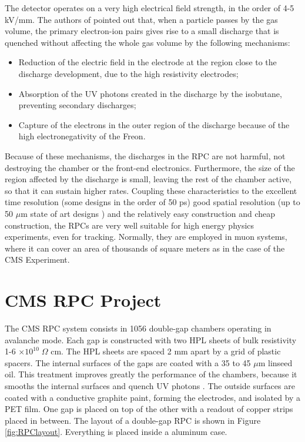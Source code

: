 The detector operates on a very high electrical field strength, in the order of 4-5 kV/mm. The authors of \cite{Santonico:1988qi} pointed out that, when a particle passes by the gas volume, the primary electron-ion pairs gives rise to a small discharge that is quenched without affecting the whole gas volume by the following mechanisms:
\begin{itemize}
    \item Reduction of the electric field in the electrode at the region close to the discharge development, due to the high resistivity electrodes;
    \item Absorption of the UV photons created in the discharge by the isobutane, preventing secondary discharges;
    \item Capture of the electrons in the outer region of the discharge because of the high electronegativity of the Freon.
\end{itemize}

Because of these mechanisms, the discharges in the RPC are not harmful, not destroying the chamber or the front-end electronics. Furthermore, the size of the region affected by the discharge is small, leaving the rest of the chamber active, so that it can sustain higher rates. Coupling these characteristics to the excellent time resolution (some designs in the order of 50 ps) good spatial resolution (up to 50 $\mu$m state of art designs \cite{Francke:2002wq}) and the relatively easy construction and cheap construction, the RPCs are very well suitable for high energy physics experiments, even for tracking. Normally, they are employed in muon systems, where it can cover an area of thousands of square meters as in the case of the CMS Experiment.

\section{CMS RPC Project}

The CMS RPC system consists in 1056 double-gap chambers operating in avalanche mode. Each gap is constructed with two HPL sheets of bulk resistivity 1-6 $\times 10^{10} \; \Omega$ cm. The HPL sheets are spaced 2 mm apart by a grid of plastic spacers. The internal surfaces of the gaps are coated with a 35 to 45 $\mu$m linseed oil. This treatment improves greatly the performance of the chambers, because it smooths the internal surfaces and quench UV photons \cite{Abbrescia:687074, Lu:2009zzd}. The outside surfaces are coated with a conductive graphite paint, forming the electrodes, and isolated by a PET film. One gap is placed on top of the other with a readout of copper strips placed in between. The layout of a double-gap RPC is shown in Figure \ref{fig:RPClayout}. Everything is placed inside a aluminum case.


